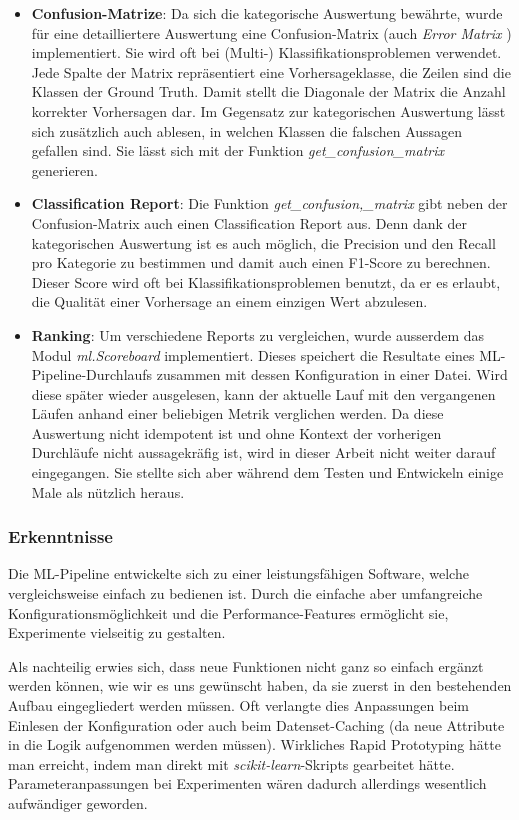 \documentclass[10pt, a4paper]{article}
\begin{document}
\begin{itemize}
	\item \textbf{Confusion-Matrize}: Da sich die kategorische Auswertung bewährte, wurde für eine detailliertere Auswertung eine Confusion-Matrix (auch \emph{Error Matrix} \cite{Stehman1997}) implementiert. Sie wird oft bei (Multi-) Klas\-si\-fi\-ka\-tions\-pro\-b\-lemen verwendet. Jede Spalte der Matrix repräsentiert eine Vorhersageklasse, die Zeilen sind die Klassen der Ground Truth. Damit stellt die Diagonale der Matrix die Anzahl korrekter Vorhersagen dar. Im Gegensatz zur kategorischen Auswertung lässt sich zusätzlich auch ablesen, in welchen Klassen die falschen Aussagen gefallen sind. Sie lässt sich mit der Funktion \emph{get\_confusion\_matrix} generieren.
	
	\item \textbf{Classification Report}: Die Funktion \emph{get\_confusion,\_matrix} gibt neben der Confusion-Matrix auch einen Classification Report aus. Denn dank der kategorischen Auswertung ist es auch möglich, die Precision und den Recall pro Kategorie zu bestimmen und damit auch einen F1-Score zu berechnen. Dieser Score wird oft bei Klassifikationsproblemen benutzt, da er es erlaubt, die Qualität einer Vorhersage an einem einzigen Wert abzulesen.
	
	\item \textbf{Ranking}: Um verschiedene Reports zu vergleichen, wurde ausserdem das Modul \emph{ml.Scoreboard} implementiert. Dieses speichert die Resultate eines ML-Pipeline-Durchlaufs zusammen mit dessen Konfiguration in einer Datei. Wird diese später wieder ausgelesen, kann der aktuelle Lauf mit den vergangenen Läufen anhand einer beliebigen Metrik verglichen werden. Da diese Auswertung nicht idempotent ist und ohne Kontext der vorherigen Durchläufe nicht aussagekräfig ist, wird in dieser Arbeit nicht weiter darauf eingegangen. Sie stellte sich aber während dem Testen und Entwickeln einige Male als nützlich heraus.
\end{itemize}

\subsubsection{Erkenntnisse}

Die ML-Pipeline entwickelte sich zu einer leistungsfähigen Software, welche vergleichsweise einfach zu bedienen ist. Durch die einfache aber umfangreiche Konfigurationsmöglichkeit und die Performance-Features ermöglicht sie, Experimente vielseitig zu gestalten.

Als nachteilig erwies sich, dass neue Funktionen nicht ganz so einfach ergänzt werden können, wie wir es uns gewünscht haben, da sie zuerst in den bestehenden Aufbau eingegliedert werden müssen. Oft verlangte dies Anpassungen beim Einlesen der Konfiguration oder auch beim Datenset-Caching (da neue Attribute in die Logik aufgenommen werden müssen). Wirkliches Rapid Prototyping hätte man erreicht, indem man direkt mit \emph{scikit-learn}-Skripts gearbeitet hätte. Parameteranpassungen bei Experimenten wären dadurch allerdings wesentlich aufwändiger geworden.
\end{document}
